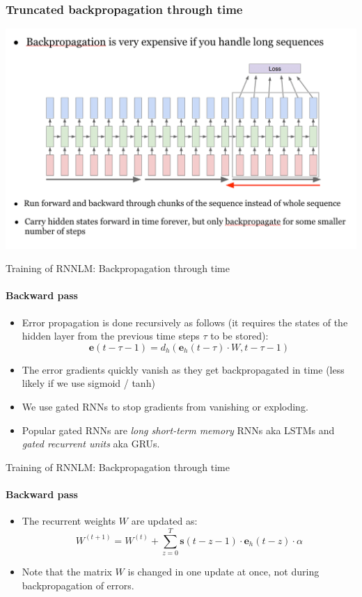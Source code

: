 \begin{frame}
\frametitle{Truncated backpropagation through time}
\centering
\includegraphics[scale=0.25]{figures/nlm/tbptt.png}
\end{frame}

\begin{frame}{Training of RNNLM: Backpropagation through time}
\framesubtitle{Backward pass}
\begin{itemize}[<+->]
	\item Error propagation is done recursively as follows (it requires the states of the hidden layer from the previous time steps $\tau$ to be stored):
	\[ \mathbf{e}(t - \tau - 1) = d_h(\mathbf{e}_h(t-\tau) \cdot W, t - \tau -1) \]
	\item The error gradients quickly vanish as they get backpropagated in time (less likely if we use sigmoid / tanh)
	\item We use gated RNNs to stop gradients from vanishing or exploding. 
	\item Popular gated RNNs are \textit{long short-term memory} RNNs aka LSTMs and \textit{gated recurrent units} aka GRUs. 
\end{itemize}
\end{frame}

\begin{frame}{Training of RNNLM: Backpropagation through time}
\framesubtitle{Backward pass}
\begin{itemize}[<+->]
	\item The recurrent weights $W$ are updated as:
	\[ W^{(t+1)} = W^{(t)} + \sum_{z=0}^T \mathbf{s}(t - z - 1) \cdot \mathbf{e}_h(t-z) \cdot \alpha \]
	\item Note that the matrix $W$ is changed in one update at once, not during backpropagation of errors.
\end{itemize}

\end{frame}

